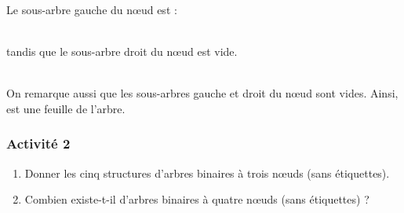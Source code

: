 \documentclass[11pt,a4paper,french,twoside]{PMCours}
\begin{document}
\begin{multicols}{3}
Le sous-arbre gauche du nœud  est :\medskip\\
 
\ \\
tandis que le sous-arbre droit du nœud  est vide.
\end{multicols}\ \medskip\\
On remarque aussi que les sous-arbres gauche et droit du nœud  sont vides. Ainsi,   est une feuille de l'arbre.

\newpage\noindent
\subsubsection*{Activité 2}
\begin{enumerate}
\item Donner les cinq structures d'arbres binaires à trois nœuds (sans étiquettes).
\item Combien existe-t-il d'arbres binaires à quatre nœuds (sans étiquettes) ?
\end{enumerate}
\vfill\noindent
\end{document}
